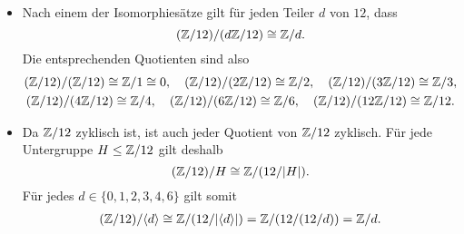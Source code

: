 \begin{itemize}
  \item
    Nach einem der Isomorphiesätze gilt für jeden Teiler $d$ von $12$, dass
    \[
            (\mathbb{Z}/12) / (d\mathbb{Z}/12) \cong \mathbb{Z}/d.
    \]
    Die entsprechenden Quotienten sind also
    \begin{gather*}
      (\mathbb{Z}/12) / (\mathbb{Z}/12)   \cong \mathbb{Z}/1 \cong 0,
      \quad
      (\mathbb{Z}/12) / (2\mathbb{Z}/12)  \cong \mathbb{Z}/2,
      \quad
      (\mathbb{Z}/12) / (3\mathbb{Z}/12)  \cong \mathbb{Z}/3,
    \\
      (\mathbb{Z}/12) / (4\mathbb{Z}/12)  \cong \mathbb{Z}/4,
      \quad
      (\mathbb{Z}/12) / (6\mathbb{Z}/12)  \cong \mathbb{Z}/6,
      \quad
      (\mathbb{Z}/12) / (12\mathbb{Z}/12) \cong \mathbb{Z}/12.
    \end{gather*}
  \item
    Da $\mathbb{Z}/12$ zyklisch ist, ist auch jeder Quotient von $\mathbb{Z}/12$ zyklisch.
    Für jede Untergruppe $H \leq \mathbb{Z}/12$ gilt deshalb
    \[
            (\mathbb{Z}/12)/H
      \cong \mathbb{Z}/( 12/|H| ).
    \]
    Für jedes $d \in \{0, 1, 2, 3, 4, 6\}$ gilt somit
    \begin{gather*}
            (\mathbb{Z}/12)/\langle d\rangle
      \cong \mathbb{Z}/(12/|\langle d\rangle|)
      =     \mathbb{Z}/(12/(12/d))
      =     \mathbb{Z}/d.
    \end{gather*}
\end{itemize}













